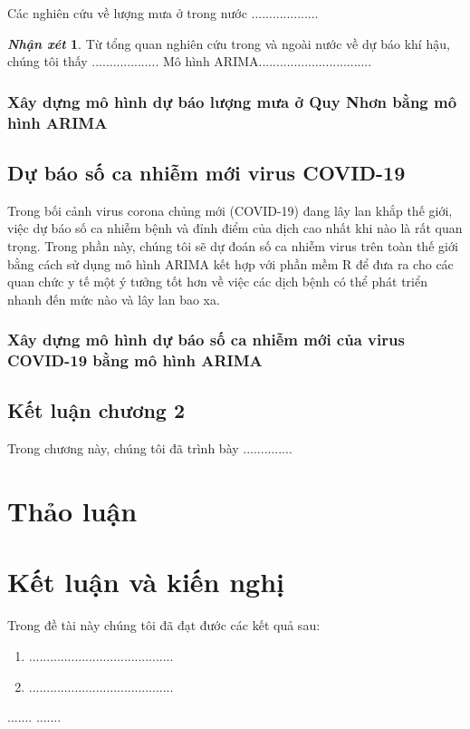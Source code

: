 \documentclass[12pt, a4paper,oneside]{book}
\theoremstyle{definition}
\newtheorem{nx}[theo]{\it Nhận xét}
\begin{document}
Các nghiên cứu về lượng mưa ở trong nước ...................

\begin{nx}
Từ tổng quan nghiên cứu trong và ngoài nước về dự báo khí hậu, chúng tôi thấy ...................
Mô hình ARIMA................................
\end{nx}
\subsection*{Xây dựng mô hình dự báo lượng mưa ở Quy Nhơn bằng mô hình ARIMA}

\section{Dự báo số ca nhiễm mới virus COVID-19}
Trong bối cảnh virus corona chủng mới (COVID-19) đang lây lan khắp thế giới, việc dự báo số ca nhiễm bệnh và đỉnh điểm của dịch cao nhất khi nào là rất quan trọng. Trong phần này, chúng tôi sẽ dự đoán số ca nhiễm virus trên toàn thế giới bằng cách sử dụng mô hình ARIMA kết hợp với phần mềm R để đưa ra cho các quan chức y tế một ý tưởng tốt hơn về việc các dịch bệnh có thể phát triển nhanh đến mức nào và lây lan bao xa.

\subsection*{Xây dựng mô hình dự báo số ca nhiễm mới của virus COVID-19  bằng mô hình ARIMA}
\section*{Kết luận chương 2}
Trong chương này, chúng tôi đã trình bày ..............

\chapter*{Thảo luận}
\chapter*{Kết luận và kiến nghị} 

Trong đề tài này chúng tôi đã đạt đước các kết quả sau:
\begin{enumerate}[(1)]
	\item
	.........................................
	\item
	.........................................
\end{enumerate} 
\begin{thebibliography}{99}
	 .......
	 .......
\end{thebibliography}
\end{document}
